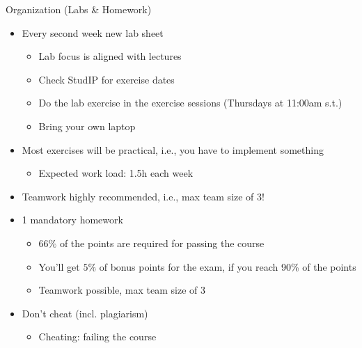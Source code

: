 \documentclass[aspectratio=169,handout]{../latex_main/tntbeamer}  %
\begin{document}
\begin{frame}[c]{Organization (Labs \& Homework)}

\vspace{-1em}
\begin{itemize}
  \item Every \alert{second} week new lab sheet
  \begin{itemize}
      \item Lab focus is aligned with lectures
      \item Check StudIP for exercise dates
      \item Do the lab exercise in the exercise sessions (Thursdays at 11:00am s.t.)
      \item Bring your own laptop
  \end{itemize}
  \item Most exercises will be practical, i.e., you have to implement something
  \begin{itemize}
    \item Expected work load: 1.5h each week
  \end{itemize}
  \item Teamwork highly recommended, i.e., max team size of 3!
  \pause
  \item 1 mandatory homework
  \begin{itemize}
      \item $66\%$ of the points are required for passing the course 
      \item You'll get $5\%$ of bonus points for the exam, if you reach 90\% of the points\\
      \item Teamwork possible, max team size of 3
  \end{itemize}
  \pause
  \item Don't cheat (incl. plagiarism)
  \begin{itemize}
    \item Cheating: failing the course
  \end{itemize}
\end{itemize}

\end{frame}
\end{document}

